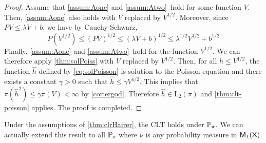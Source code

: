 \documentclass[english,graybox,envcountchap,envcountsame,sectrefs,shortlabels]{svmono}
\theoremstyle{style}
\newcommand{\ltwo}{\mathrm{L}_2}
\begin{document}
\begin{proof}
Assume that \ref{assum:Aone} and \ref{assum:Atwo}\ hold for some function $V$. Then, \ref{assum:Aone} also holds with $V$ replaced by $V^{1/2}$. Moreover, since $PV\leq \lambda V +b$, we have by Cauchy-Schwarz,
$$
P(V^{1/2}) \leq (PV)^{1/2}\leq (\lambda V +b)^{1/2}\leq  \lambda^{1/2} V^{1/2}+b^{1/2}
$$
Finally, \ref{assum:Aone} and \ref{assum:Atwo}\ hold for the function $V^{1/2}$. We can therefore apply \autoref{thm:solPoiss} with $V$ replaced by $V^{1/2}$. Then, for all $h\leq V^{1/2}$, the function $\hat h$ defined by \eqref{eq:solPoisson} is solution to the Poisson equation and there exists a constant $\gamma>0$ such that
$\hat h\leq \gamma V^{1/2}$. This implies that $\pi(\hat h^2) \leq \gamma \pi(V)<\infty$ by \autoref{cor:ergod}. Therefore $\hat{h} \in \ltwo(\pi)$ and  \autoref{thm:clt-poisson} applies. The proof is completed.
\end{proof}

Under the assumptions of \autoref{thm:clrHairer}, the CLT holds under $\mathbb{P}_\pi$. We can actually extend this result to all $\mathbb{P}_\nu$ where $\nu$ is any probability measure in $\mathsf{M}_{1}(\mathsf{X})$.
\end{document}
